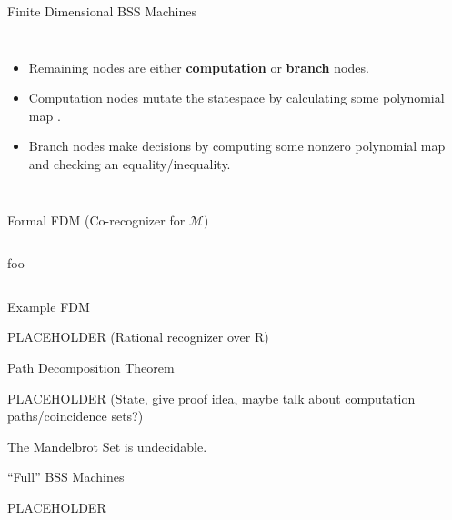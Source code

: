 \documentclass[c]{beamer}
\begin{document}
\begin{frame}{Finite Dimensional BSS Machines}
  
  \begin{columns}
    
    \begin{itemize}
    \item Remaining nodes are either \textbf{computation} or
      \textbf{branch} nodes.
    \item Computation nodes mutate the statespace by calculating some
      polynomial map .
    \item Branch nodes make decisions by computing some nonzero
      polynomial map  and checking an equality/inequality.

    \end{itemize}
    \scaletopagewidth[.9]{\mandelrecpII{}}
    
  \end{columns}
  
\end{frame}

\begin{frame}{Formal FDM (Co-recognizer for $\mathcal{M})$}
  
    \begin{columns}
    foo
    \scaletopagewidth[.9]{\mandelrecfull{}}
    
  \end{columns}
  
 
\end{frame}

\begin{frame}{Example FDM}
  
  PLACEHOLDER (Rational recognizer over R)
 
\end{frame}

\begin{frame}{Path Decomposition Theorem}

  PLACEHOLDER (State, give proof idea, maybe talk about computation
  paths/coincidence sets?)
  
\end{frame}

\begin{frame}
  \begin{corollary}
    The Mandelbrot Set is undecidable.
  \end{corollary}
\end{frame}

\begin{frame}{``Full'' BSS Machines}

  PLACEHOLDER

\end{frame}
\end{document}
